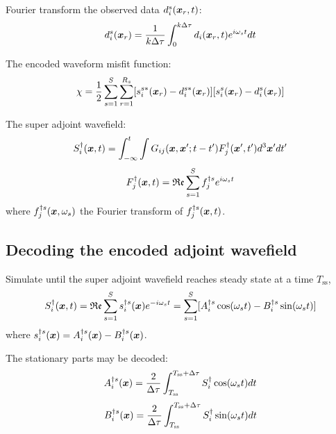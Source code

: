 Fourier transform the observed data $d_i^s(\boldsymbol{x}_r, t)$:
\[ d_i^s(\boldsymbol{x}_r) = \frac{1}{k \Delta\tau} \int_0^{k \Delta\tau}
  d_i(\boldsymbol{x}_r, t) e^{i\omega_s t} dt \]

The encoded waveform misfit function:
\[ \chi = \frac{1}{2} \sum_{s=1}^S \sum_{r=1}^{R_s} [ s_i^{s*}(\boldsymbol{x}_r)
  - d_i^{s*}(\boldsymbol{x}_r) ][ s_i^s(\boldsymbol{x}_r) - d_i^s(\boldsymbol{x}_r) ] \]

The super adjoint wavefield:
\[ S_i^\dagger(\boldsymbol{x}, t) = \int_{-\infty}^t \int
  G_{ij}(\boldsymbol{x}, \boldsymbol{x}'; t - t') F_j^\dagger(\boldsymbol{x}', t') d^3\boldsymbol{x}' dt' \]
\[ F_j^\dagger(\boldsymbol{x}, t) = \mathfrak{Re} \sum_{s=1}^S f_j^{\dagger s}
  e^{i\omega_s t} \]
where $f_j^{\dagger s}(\boldsymbol{x}, \omega_s)$ the Fourier transform of
$f_j^{\dagger s}(\boldsymbol{x}, t)$.

\subsection{Decoding the encoded adjoint wavefield}
Simulate until the super adjoint wavefield reaches steady state
at a time $T_\text{ss}$,
\[ S_i^\dagger(\boldsymbol{x}, t) = \mathfrak{Re} \sum_{s=1}^S s_i^{\dagger s}(\boldsymbol{x})
  e^{-i\omega_s t} = \sum_{s=1}^S [ A_i^{\dagger s} \cos(\omega_s t)
  - B_i^{\dagger s} \sin(\omega_s t) ] \]
where $s_i^{\dagger s}(\boldsymbol{x}) = A_i^{\dagger s}(\boldsymbol{x})
- B_i^{\dagger s}(\boldsymbol{x})$.

The stationary parts may be decoded:
\[ A_i^{\dagger s}(\boldsymbol{x}) = \frac{2}{\Delta\tau}
  \int_{T_\text{ss}}^{T_\text{ss} + \Delta\tau}
  S_i^\dagger \cos(\omega_s t) dt \]
\[ B_i^{\dagger s}(\boldsymbol{x}) = \frac{2}{\Delta\tau}
  \int_{T_\text{ss}}^{T_\text{ss} + \Delta\tau}
  S_i^\dagger \sin(\omega_s t) dt \]

